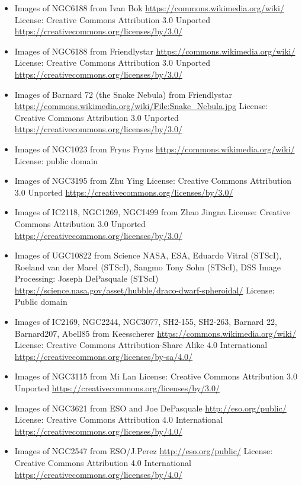 \begin{itemize}
	 \url{https://www.spacetelescope.org/}
	 License: Creative Commons Attribution 4.0 International \url{https://creativecommons.org/licenses/by/4.0/}
\item Images of NGC6188
	 from Ivan Bok
	 \url{https://commons.wikimedia.org/wiki/}
	 License: Creative Commons Attribution 3.0 Unported \url{https://creativecommons.org/licenses/by/3.0/}
\item Images of NGC6188
	 from Friendlystar
	 \url{https://commons.wikimedia.org/wiki/}
	 License: Creative Commons Attribution 3.0 Unported \url{https://creativecommons.org/licenses/by/3.0/}
\item Images of Barnard 72 (the Snake Nebula)
	 from Friendlystar
	 \url{https://commons.wikimedia.org/wiki/File:Snake_Nebula.jpg}
	 License: Creative Commons Attribution 3.0 Unported \url{https://creativecommons.org/licenses/by/3.0/}
\item Images of NGC1023
	 from Fryns Fryns
	 \url{https://commons.wikimedia.org/wiki/}
	 License: public domain
\item Images of NGC3195
	 from Zhu Ying
	 License: Creative Commons Attribution 3.0 Unported \url{https://creativecommons.org/licenses/by/3.0/}
\item Images of IC2118, NGC1269, NGC1499
	 from Zhao Jingna
	 License: Creative Commons Attribution 3.0 Unported \url{https://creativecommons.org/licenses/by/3.0/}
\item Images of UGC10822
	 from Science NASA, ESA, Eduardo Vitral (STScI), Roeland van der Marel (STScI), Sangmo Tony Sohn (STScI), DSS Image Processing: Joseph DePasquale (STScI)
	 \url{https://science.nasa.gov/asset/hubble/draco-dwarf-spheroidal/}
	 License: Public domain
\item Images of IC2169, NGC2244, NGC3077, SH2-155, SH2-263, Barnard 22, Barnard207,
	 Abell85
	 from Keesscherer
	 \url{https://commons.wikimedia.org/wiki/}
	 License: Creative Commons Attribution-Share Alike 4.0 International \url{https://creativecommons.org/licenses/by-sa/4.0/}
\item Images of NGC3115
	 from Mi Lan
	 License: Creative Commons Attribution 3.0 Unported \url{https://creativecommons.org/licenses/by/3.0/}
\item Images of NGC3621
	 from ESO and Joe DePasquale
	 \url{http://eso.org/public/}
	 License: Creative Commons Attribution 4.0 International \url{https://creativecommons.org/licenses/by/4.0/} 
\item Images of NGC2547
	 from ESO/J.Perez
	 \url{http://eso.org/public/}
	 License: Creative Commons Attribution 4.0 International \url{https://creativecommons.org/licenses/by/4.0/} 

\end{itemize}
